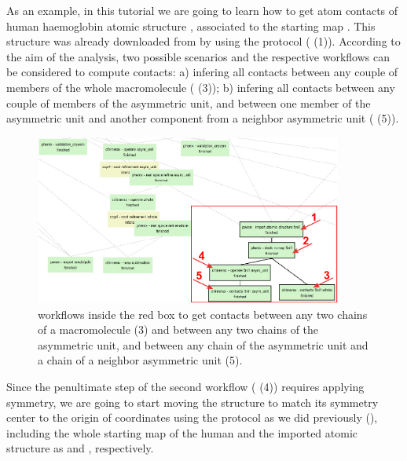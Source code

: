 As an example, in this tutorial we are going to learn how to get atom contacts of human haemoglobin  atomic structure , associated to the starting map . This structure was already downloaded from  by using the protocol  ( (1)). According to the aim of the analysis, two possible scenarios and the respective workflows can be considered to compute contacts: a) infering all contacts between any couple of members of the whole macromolecule ( (3)); b) infering all contacts between any couple of members of the asymmetric unit, and between one member of the asymmetric unit and another component from a neighbor asymmetric unit ( (5)). 

        \begin{figure}[H]
            \centering 
            \captionsetup{width=.9\linewidth} 
            \includegraphics[width=0.9\textwidth]{Images/Fig46}
            \caption{\scipion workflows inside the red box to get contacts between any two chains of a macromolecule (3) and between any two chains of the asymmetric unit, and between any chain of the asymmetric unit and a chain of a neighbor asymmetric unit (5).}
            \label{fig:workflows_contacts}
        \end{figure}
        
Since the penultimate step of the second workflow ( (4)) requires applying symmetry, we are going to start moving the structure to match its symmetry center to the origin of coordinates using the protocol  as we did previously (), including the whole starting map of the human  and the imported atomic structure  as  and , respectively.\\


